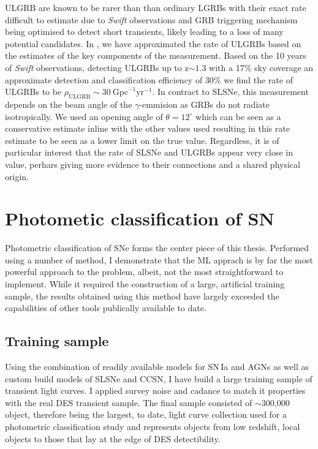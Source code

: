 ULGRB are known to be rarer than than ordinary LGRBs with their exact rate difficult to estimate due to \textit{Swift} observations and GRB triggering mechanism being optimised to detect short transients, likely leading to a loss of many potential candidates. In \citet{Prajs2016}, we have approximated the rate of ULGRBs based on the estimates of the key components of the measurement. Based on the 10 years of \textit{Swift} observations, detecting ULGRBs up to z$\sim1.3$ with a 17\% sky coverage an approximate detection and classification efficiency of 30\% we find the rate of ULGRBs to be $\rho_{\mathrm{ULGRB}} \sim 30~\mathrm{Gpc}^{-1} \mathrm{yr}^{-1}$. In contract to SLSNe, this measurement depends on the beam angle of the $\gamma$-emmision as GRBs do not radiate isotropically. We used an opening angle of $\theta=12^\circ$ which can be seen as a conservative estimate inline with the other values used resulting in this rate estimate to be seen as a lower limit on the true value. Regardless, it is of particular interest that the rate of SLSNe and ULGRBs appear very close in value, perhars giving more evidence to their connections and a shared physical origin.

\section{Photometic classification of SN}
Photometric classification of SNe forms the center piece of this thesis. Performed using a number of method, I demonstrate that the ML apprach is by far the most powerful approach to the problem, albeit, not the most straightforward to implement. While it required the construction of a large, artificial training sample, the results obtained using this method have largely exceeded the capabilities of other tools publically available to date.

\subsection{Training sample}
Using the combination of readily available models for SN\,Ia and AGNs as well as custom build models of SLSNe and CCSN, I have build a large training sample of transient light curves. I applied survey noise and cadance to match it properties with the real DES transient sample. The final sample consisted of $\sim$300,000 object, therefore being the largest, to date, light curve collection used for a photometric classification study and represents objects from low redshift, local objects to those that lay at the edge of DES detectibility.

